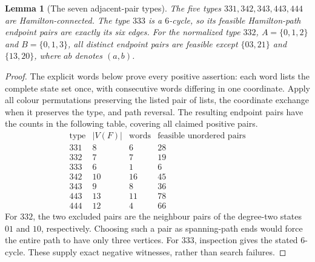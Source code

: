 \documentclass[11pt]{article}
\newtheorem{lemma}[theorem]{Lemma}
\theoremstyle{remark}
\numberwithin{equation}{section}
\begin{document}
\begin{lemma}[The seven adjacent-pair types]
\label{lem:pair-five-endpoints}
The five types $331,342,343,443,444$ are Hamilton-connected.
The type $333$ is a $6$-cycle, so its feasible Hamilton-path endpoint
pairs are exactly its six edges.  For the normalized type $332$,
$A=\{0,1,2\}$ and $B=\{0,1,3\}$, all distinct endpoint pairs are
feasible except $\{03,21\}$ and $\{13,20\}$, where $ab$ denotes
$(a,b)$.
\end{lemma}

\begin{proof}
The explicit words below prove every positive assertion: each word
lists the complete state set once, with consecutive words differing in
one coordinate.  Apply all colour permutations preserving the listed
pair of lists, the coordinate exchange when it preserves the type, and
path reversal.  The resulting endpoint pairs have the counts in the
following table, covering all claimed positive pairs.
\[
\begin{array}{c|r|r|r}
 \text{type}&|V(F)|&\text{words}&\text{feasible unordered pairs}\\\hline
 331&8&6&28\\
 332&7&7&19\\
 333&6&1&6\\
 342&10&16&45\\
 343&9&8&36\\
 443&13&11&78\\
 444&12&4&66
\end{array}
\]
For $332$, the two excluded pairs are the neighbour pairs of the
degree-two states $01$ and $10$, respectively.  Choosing such a pair
as spanning-path ends would force the entire path to have only three
vertices.  For $333$, inspection gives the stated $6$-cycle.  These
supply exact negative witnesses, rather than search failures.
\end{proof}
\end{document}
